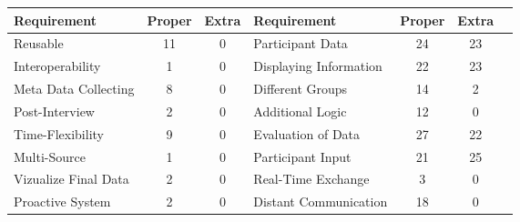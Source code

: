     \begin{table}[htbp]
        \centering
        \begin{tabular}{lcclccc}
        \hline
        Requirement          & \multicolumn{1}{l}{Proper} & \multicolumn{1}{l}{Extra} & Requirement & \multicolumn{1}{l}{Proper} & \multicolumn{1}{l}{Extra} \\ \hline
        Reusable                                                  & 11                         & 0                         & Participant Data                                           & 24                         & 23                        \\
        Interoperability                                           & 1                          & 0                         & Displaying Information                                     & 22                         & 23                        \\
        Meta Data Collecting                                       & 8                          & 0                         & Different Groups                                           & 14                         & 2                         \\
        Post-Interview                                             & 2                          & 0                         & Additional Logic                                           & 12                         & 0                         \\
        Time-Flexibility                                           & 9                          & 0                         & Evaluation of Data                                         & 27                         & 22                        \\
        Multi-Source                                               & 1                          & 0                         & Participant Input                                          & 21                         & 25                        \\
        Vizualize Final Data                                       & 2                          & 0                         & Real-Time Exchange                                         & 3                          & 0                         \\
        Proactive System                                           & 2                          & 0                         & Distant Communication                                      & 18                         & 0                         \\

\end{tabular}
\end{table}
